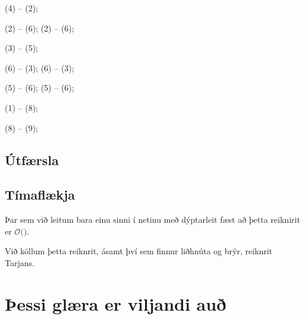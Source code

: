 {{{			 {  (4) -- (2); }

			 {  (2) -- (6); }
			\onslide<all:20> {  (2) -- (6); }

			 {  (3) -- (5); }

			 {  (6) -- (3); }
			\onslide<all:6-7> {  (6) -- (3); }

			 {  (5) -- (6); }
			\onslide<all:10-11> {  (5) -- (6); }

			 {  (1) -- (8); }

			 {  (8) -- (9); }
		}
	}
}

\subsection{Útfærsla}
{
}

\subsection{Tímaflækja}
{
	{
		\item<1-> Þar sem við leitum bara einu sinni í netinu með dýptarleit fæst að þetta reiknirit er $\mathcal{O}($\onslide<2->{$E + V$}$)$.
		\item<3-> Við köllum þetta reiknrit, ásamt því sem finnur liðhnúta og brýr, reiknrit Tarjans.
	}
}

\section{Þessi glæra er viljandi auð}
{
}


